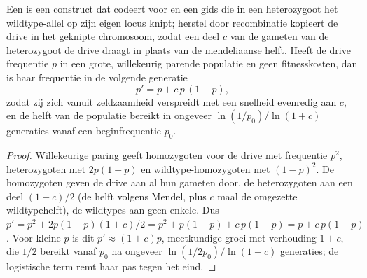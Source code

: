 \begin{theorem}\label{thm:b3:genetic-engineering:drive}
Een \emph{} is een construct dat codeert voor  en een gids
die in een heterozygoot het wildtype-allel op zijn eigen locus knipt;
herstel door recombinatie kopieert de drive in het geknipte chromosoom,
zodat een deel $c$ van de gameten van de heterozygoot de drive draagt
in plaats van de mendeliaanse helft. Heeft de drive frequentie $p$ in
een grote, willekeurig parende populatie en geen fitnesskosten, dan is
haar frequentie in de volgende generatie
\[
p' = p + c\,p\,(1 - p),
\]
zodat zij zich vanuit zeldzaamheid verspreidt met een snelheid
evenredig aan $c$, en de helft van de populatie bereikt in ongeveer
$\ln(1/p_{0})/\ln(1 + c)$ generaties vanaf een beginfrequentie $p_{0}$.
\end{theorem}
\begin{proof}
Willekeurige paring geeft homozygoten voor de drive met frequentie
$p^{2}$, heterozygoten met $2p(1-p)$ en wildtype-homozygoten met
$(1-p)^{2}$. De homozygoten geven de drive aan al hun gameten door, de
heterozygoten aan een deel $(1 + c)/2$ (de helft volgens Mendel, plus
$c$ maal de omgezette wildtypehelft), de wildtypes aan geen enkele.
Dus $p' = p^{2} + 2p(1-p)(1+c)/2
= p^{2} + p(1-p) + c\,p(1-p) = p + c\,p(1-p)$. Voor kleine $p$ is dit
$p' \approx (1+c)p$, meetkundige groei met verhouding $1 + c$, die
$1/2$ bereikt vanaf $p_{0}$ na ongeveer $\ln(1/2p_{0})/\ln(1+c)$
generaties; de logistische term remt haar pas tegen het eind.
\end{proof}

